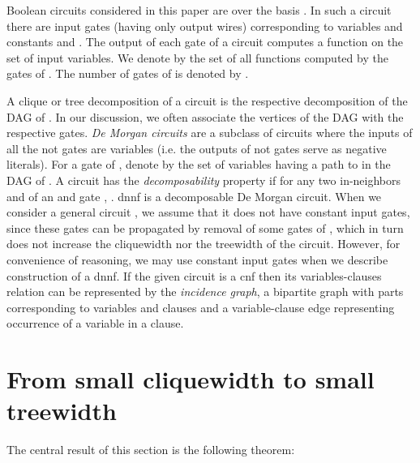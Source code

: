 \documentclass{llncs}
\begin{document}
Boolean circuits considered in this paper are over the basis .
In such a circuit there are input gates (having only output wires) corresponding to variables and constants
 and . The output of each gate of a circuit  computes a function on the set of input variables.
We denote by  the set of all functions computed by the gates of .
The number of gates of  is denoted by .

A clique or tree decomposition of a circuit  is the respective decomposition of the 
DAG of . In our discussion, we often associate the vertices of the DAG with the respective gates.
\emph{De Morgan circuits} are a subclass of circuits where the inputs of all the {\sc not} gates are variables
(i.e. the outputs of {\sc not} gates serve as negative literals). For a gate  of , denote by 
the set of variables having a path to  in the DAG of . A circuit  has the \emph{decomposability} property
if for any two in-neighbors  and  of an {\sc and} gate , .
{\sc dnnf} is a decomposable De Morgan circuit. 
When we consider a general circuit , we assume that it does not
have constant input gates, since these gates can be propagated by removal of some gates of , which in turn
does not increase the cliquewidth nor the treewidth of the circuit. However, for convenience of reasoning, 
we may use constant input gates when we describe construction of a {\sc dnnf}. If the given circuit  is a {\sc cnf}
then its variables-clauses relation can be represented by the \emph{incidence graph}, 
a bipartite graph with parts corresponding to variables and clauses and a variable-clause
edge representing occurrence of a variable in a clause. 
\begin{comment}
A \emph{satisfying assignment} of a {\sc cnf}  is a set  of literals
such that each clause  of  contains at least one literal of . We say that {\sc cnf}s  and  are \emph{equivalent}
if they have the same set of satisfying assignments. A \emph{projection} of a set  of literals to a set  of variables is
a subset  of  consisting of all the literals whose variables belong to . A {\sc cnf}  is a projection of a {\sc cnf} 
to a set  of variables if the following two conditions are true: (i) if  is a satisfying assignment of  then the projection
of  to  is a satisfying assignment of  (ii) any satisfying assignment of  can be extended to a satisfying assignment of 
.
\end{comment}



\section{From small cliquewidth to small treewidth}
The central result of this section is the following theorem:
\end{document}
